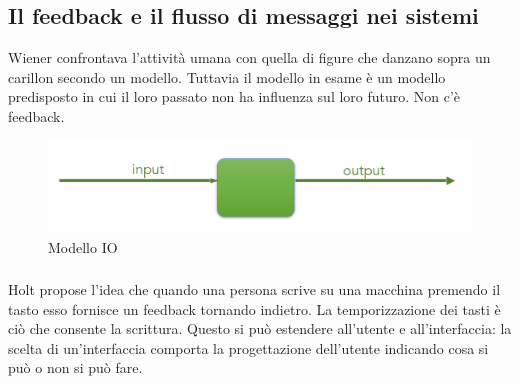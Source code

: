 \subsection{Il feedback e il flusso di messaggi nei sistemi}
\label{feedback}
Wiener confrontava l'attività umana con quella di figure che danzano sopra
un carillon secondo un modello. Tuttavia il modello in esame è un modello
predisposto in cui il loro passato non ha influenza sul loro futuro. Non 
c'è feedback.

\begin{figure}[h]
    \centering
    \includegraphics[scale=0.35]{images/IO.png}
    \caption{Modello IO}
\end{figure}

\subsubsection{}

Holt propose l'idea che quando una persona scrive su una macchina premendo il tasto
esso fornisce un feedback tornando indietro. La temporizzazione dei tasti è
ciò che consente la scrittura.
Questo si può estendere all'utente e all'interfaccia: la scelta di un'interfaccia comporta
la progettazione dell'utente indicando cosa si può o non si può fare.

